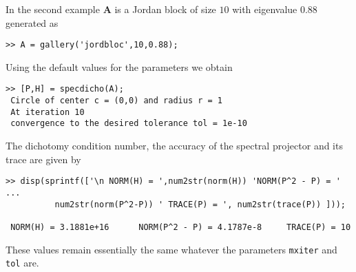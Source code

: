 \documentclass[acmtocl]{acmtrans2m}
\newcommand{\Am}{\mathbf{A}}
\begin{document}
In the second example $\Am$ is a Jordan block of size $10$ with  eigenvalue $0.88$ generated as
\begin{verbatim}
>> A = gallery('jordbloc',10,0.88);
\end{verbatim}
Using the default values for the  parameters we obtain
\begin{verbatim}
>> [P,H] = specdicho(A);
 Circle of center c = (0,0) and radius r = 1
 At iteration 10
 convergence to the desired tolerance tol = 1e-10
 \end{verbatim}
The dichotomy condition number, the accuracy of the spectral projector and its trace are given by
\begin{verbatim}
>> disp(sprintf(['\n NORM(H) = ',num2str(norm(H)) 'NORM(P^2 - P) = ' ...
	      num2str(norm(P^2-P)) ' TRACE(P) = ', num2str(trace(P)) ]));

 NORM(H) = 3.1881e+16      NORM(P^2 - P) = 4.1787e-8     TRACE(P) = 10
\end{verbatim}
These values remain essentially the same whatever the parameters  {\tt mxiter}  and  {\tt tol}  are.
\end{document}
